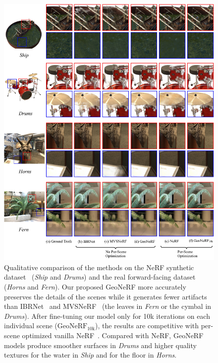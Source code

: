 \begin{figure}[!t]
    \begin{center}
        \includegraphics[width=1.0\linewidth]{images/chapter3/figures/Qualitative.jpg}
    \end{center}
   \caption{Qualitative comparison of the methods on the NeRF synthetic dataset~\citep{martin2021nerf} (\textit{Ship} and \textit{Drums}) and the real forward-facing dataset~\citep{mildenhall2019llff} (\textit{Horns} and \textit{Fern}). Our proposed GeoNeRF more accurately preserves the details of the scenes while it generates fewer artifacts than IBRNet~\citep{wang2021ibrnet} and MVSNeRF~\citep{chen2021mvsnerf} (\eg the leaves in \textit{Fern} or the cymbal in \textit{Drums}). After fine-tuning our model only for 10k iterations on each individual scene ($\text{GeoNeRF}_{\text{10k}}$), the results are competitive with per-scene optimized vanilla NeRF~\citep{mildenhall2020nerf}. Compared with NeRF, GeoNeRF models produce smoother surfaces in \textit{Drums} and higher quality textures for the water in \textit{Ship} and for the floor in \textit{Horns}.}
    \label{fig:c3_qualitative}
\end{figure}

